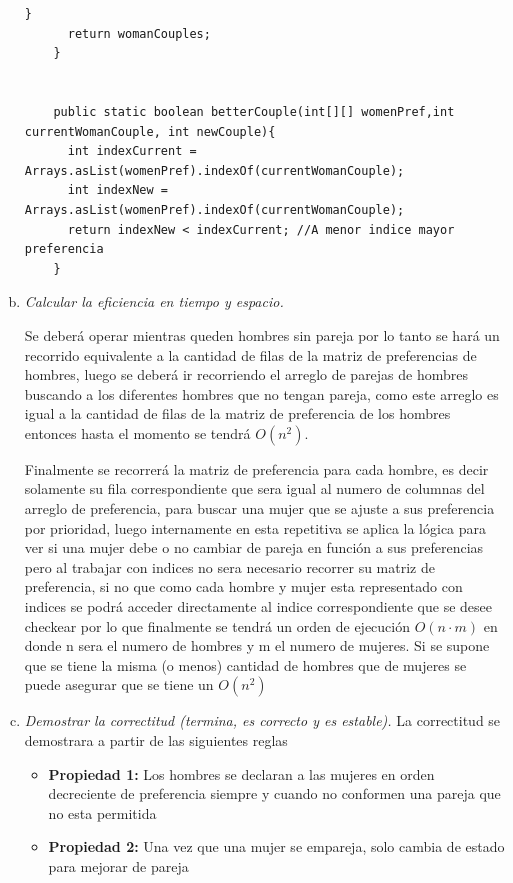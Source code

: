 \begin{enumerate}[a)]
\begin{lstlisting}[style=java,caption= Implementacion problema de las parejas con asignaciones estables]
      }
      return womanCouples;
    }
  
  
    public static boolean betterCouple(int[][] womenPref,int currentWomanCouple, int newCouple){
      int indexCurrent = Arrays.asList(womenPref).indexOf(currentWomanCouple);
      int indexNew = Arrays.asList(womenPref).indexOf(currentWomanCouple);
      return indexNew < indexCurrent; //A menor indice mayor preferencia
    }
  \end{lstlisting}

  \item \textit{Calcular la eficiencia en tiempo y espacio.}
  
  Se deberá operar mientras queden hombres sin pareja por lo tanto se hará un recorrido equivalente a la cantidad de filas de la matriz de preferencias de hombres, luego se deberá ir recorriendo el arreglo de parejas de hombres buscando a los diferentes hombres que no tengan pareja, como este arreglo es igual a la cantidad de filas de la matriz de preferencia de los hombres entonces hasta el momento se tendrá $O(n^2)$.

  Finalmente se recorrerá la matriz de preferencia para cada hombre, es decir solamente su fila correspondiente que sera igual al numero de columnas del arreglo de preferencia, para buscar una mujer que se ajuste a sus preferencia por prioridad, luego internamente en esta repetitiva se aplica la lógica para ver si una mujer debe o no cambiar de pareja en función a sus preferencias pero al trabajar con indices no sera necesario recorrer su matriz de preferencia, si no que como cada hombre y mujer esta representado con indices se podrá acceder directamente al indice correspondiente que se desee checkear por lo que finalmente se tendrá un orden de ejecución $O(n\cdot m)$ en donde n sera el numero de hombres y m el numero de mujeres. Si se supone que se tiene la misma (o menos) cantidad de hombres que de mujeres se puede asegurar que se tiene un $O(n^2)$

  \item \textit{Demostrar la correctitud (termina, es correcto y es estable).}
  La correctitud se demostrara a partir de las siguientes reglas
  \begin{itemize}
    \item \textbf{Propiedad 1: }Los hombres se declaran a las mujeres en orden decreciente de preferencia siempre y cuando no conformen una pareja que no esta permitida
    \item \textbf{Propiedad 2: }Una vez que una mujer se empareja, solo cambia de estado para mejorar de pareja
  \end{itemize}


\end{enumerate}
